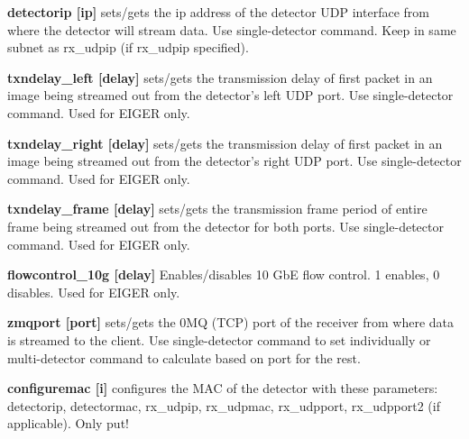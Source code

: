 \begin{DoxyItemize}
\item {\bfseries detectorip \mbox{[}ip\mbox{]}} sets/gets the ip address of the detector UDP interface from where the detector will stream data. Use single-\/detector command. Keep in same subnet as rx\_\-udpip (if rx\_\-udpip specified).
\end{DoxyItemize}


\begin{DoxyItemize}
\item {\bfseries txndelay\_\-left \mbox{[}delay\mbox{]}} sets/gets the transmission delay of first packet in an image being streamed out from the detector's left UDP port. Use single-\/detector command. Used for EIGER only.
\end{DoxyItemize}


\begin{DoxyItemize}
\item {\bfseries txndelay\_\-right \mbox{[}delay\mbox{]}} sets/gets the transmission delay of first packet in an image being streamed out from the detector's right UDP port. Use single-\/detector command. Used for EIGER only.
\end{DoxyItemize}


\begin{DoxyItemize}
\item {\bfseries txndelay\_\-frame \mbox{[}delay\mbox{]}} sets/gets the transmission frame period of entire frame being streamed out from the detector for both ports. Use single-\/detector command. Used for EIGER only.
\end{DoxyItemize}


\begin{DoxyItemize}
\item {\bfseries flowcontrol\_\-10g \mbox{[}delay\mbox{]}} Enables/disables 10 GbE flow control. 1 enables, 0 disables. Used for EIGER only.
\end{DoxyItemize}


\begin{DoxyItemize}
\item {\bfseries zmqport \mbox{[}port\mbox{]}} sets/gets the 0MQ (TCP) port of the receiver from where data is streamed to the client. Use single-\/detector command to set individually or multi-\/detector command to calculate based on {\ttfamily port} for the rest.
\end{DoxyItemize}


\begin{DoxyItemize}
\item {\bfseries configuremac \mbox{[}i\mbox{]}} configures the MAC of the detector with these parameters: detectorip, detectormac, rx\_\-udpip, rx\_\-udpmac, rx\_\-udpport, rx\_\-udpport2 (if applicable). Only put!
\end{DoxyItemize}


